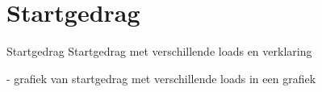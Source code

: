 \section{Startgedrag}

Startgedrag
Startgedrag met verschillende loads en verklaring

- grafiek van startgedrag met verschillende loads in een grafiek
